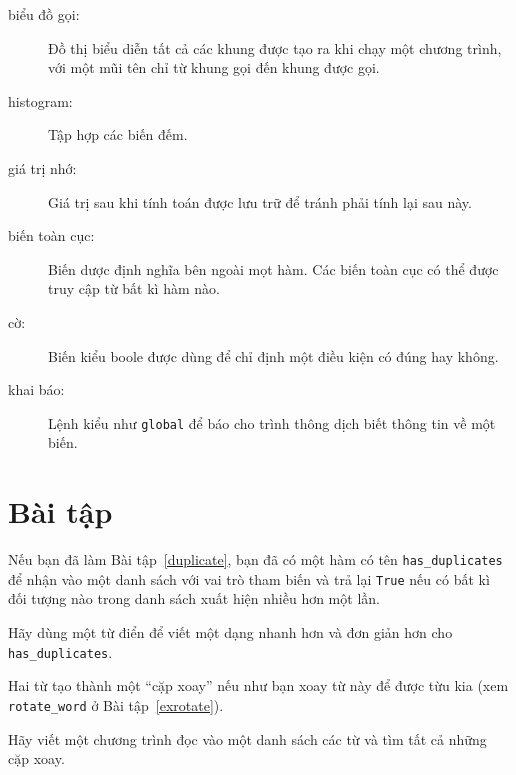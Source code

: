 \documentclass[11pt]{book}
\begin{document}
\begin{description}
\item[biểu đồ gọi:] Đồ thị biểu diễn tất cả các khung được tạo ra
khi chạy một chương trình, với một mũi tên chỉ từ khung gọi đến
khung được gọi.

\item[histogram:] Tập hợp các biến đếm.

\item[giá trị nhớ:] Giá trị sau khi tính toán được lưu trữ để tránh
phải tính lại sau này.

\item[biến toàn cục:] Biến dược định nghĩa bên ngoài mọt hàm. Các biến
toàn cục có thể được truy cập từ bất kì hàm nào.

\item[cờ:] Biến kiểu boole được dùng để chỉ định một điều kiện có đúng
hay không.

\item[khai báo:] Lệnh kiểu như {\tt global} để báo cho trình thông dịch
biết thông tin về một biến.

\end{description}

\section{Bài tập}

\begin{ex}

Nếu bạn đã làm Bài tập~\ref{duplicate}, bạn đã có một hàm có tên
\verb"has_duplicates" để nhận vào một danh sách với vai trò tham biến và
trả lại {\tt True} nếu có bất kì đối tượng nào trong danh sách 
xuất hiện nhiều hơn một lần.

Hãy dùng một từ điển để viết một dạng nhanh hơn và đơn giản hơn cho
\verb"has_duplicates".
\end{ex}


\begin{ex}
\label{exrotatepairs}


Hai từ tạo thành một ``cặp xoay'' nếu như bạn xoay từ này để được từu kia
(xem \verb"rotate_word" ở Bài tập~\ref{exrotate}).

Hãy viết một chương trình đọc vào một danh sách các từ và tìm tất cả
những cặp xoay.
\end{ex}
\end{document}
